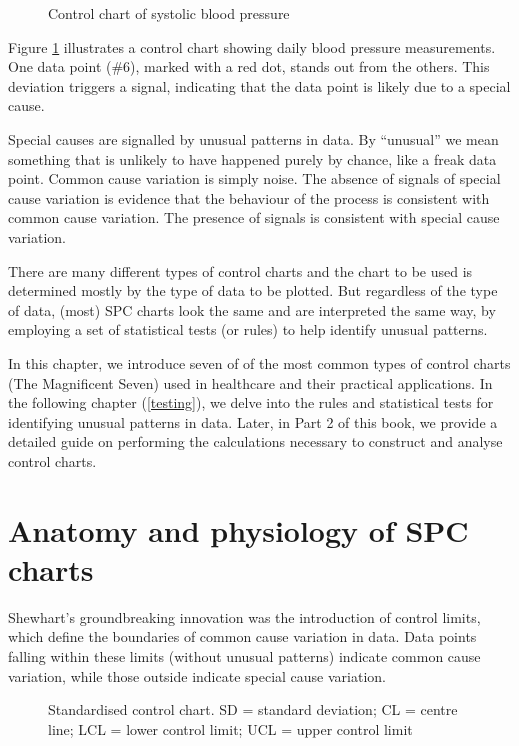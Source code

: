 \documentclass[
]{book}
\makeatletter
\newcommand*\pandocbounded[1]{%
  \sbox\pandoc@box{#1}%
  \Gscale@div\@tempa{\textheight}{\dimexpr\ht\pandoc@box+\dp\pandoc@box\relax}%
  \Gscale@div\@tempb{\linewidth}{\wd\pandoc@box}%
  \ifdim\@tempb\p@<\@tempa\p@\let\@tempa\@tempb\fi%
  \ifdim\@tempa\p@<\p@\scalebox{\@tempa}{\usebox\pandoc@box}%
  \else\usebox{\pandoc@box}%
  \fi%
}
\makeatother
\begin{document}
\begin{figure}
\centering
\pandocbounded{}
\caption{\label{fig:spc-fig0}Control chart of systolic blood pressure}
\end{figure}

Figure \ref{fig:spc-fig0} illustrates a control chart showing daily blood pressure measurements. One data point (\#6), marked with a red dot, stands out from the others. This deviation triggers a signal, indicating that the data point is likely due to a special cause.

Special causes are signalled by unusual patterns in data. By ``unusual'' we mean something that is unlikely to have happened purely by chance, like a freak data point. Common cause variation is simply noise. The absence of signals of special cause variation is evidence that the behaviour of the process is consistent with common cause variation. The presence of signals is consistent with special cause variation.

There are many different types of control charts and the chart to be used is determined mostly by the type of data to be plotted. But regardless of the type of data, (most) SPC charts look the same and are interpreted the same way, by employing a set of statistical tests (or rules) to help identify unusual patterns.

In this chapter, we introduce seven of of the most common types of control charts (The Magnificent Seven) used in healthcare and their practical applications. In the following chapter (\ref{testing}), we delve into the rules and statistical tests for identifying unusual patterns in data. Later, in Part 2 of this book, we provide a detailed guide on performing the calculations necessary to construct and analyse control charts.

\section{Anatomy and physiology of SPC charts}\label{anatomy-and-physiology-of-spc-charts}

Shewhart's groundbreaking innovation was the introduction of control limits, which define the boundaries of common cause variation in data. Data points falling within these limits (without unusual patterns) indicate common cause variation, while those outside indicate special cause variation.

\begin{figure}
\centering
\pandocbounded{}
\caption{\label{fig:spc-fig1}Standardised control chart. SD = standard deviation; CL = centre line; LCL = lower control limit; UCL = upper control limit}
\end{figure}
\end{document}
